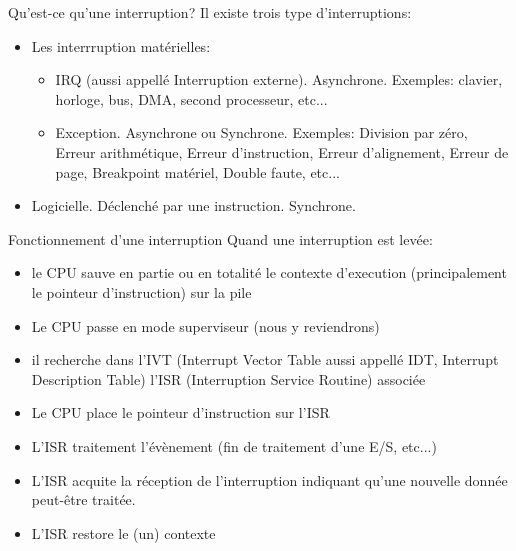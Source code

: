 \begin{frame}{Qu'est-ce qu'une interruption?}
  Il existe trois type d'interruptions:
  \begin{itemize} 
  \item Les interrruption matérielles:
    \begin{itemize} 
    \item IRQ (aussi appellé Interruption externe). Asynchrone. Exemples: clavier, horloge, bus, DMA, second processeur, etc...
    \item Exception.  Asynchrone ou Synchrone.  Exemples: Division par
      zéro,   Erreur   arithmétique,   Erreur  d'instruction,   Erreur
      d'alignement, Erreur de page, Breakpoint matériel, Double faute,
      etc...
    \end{itemize} 
  \item Logicielle. Déclenché par une instruction. Synchrone.
  \end{itemize}
\end{frame} 

\begin{frame}{Fonctionnement d'une interruption}
  Quand une  interruption est levée:
  \begin{itemize} 
  \item le CPU sauve en  partie ou en totalité le contexte d'execution
    (principalement le pointeur d'instruction) sur la pile
  \item Le CPU passe en mode superviseur (nous y reviendrons)
  \item il recherche dans  l'IVT (Interrupt Vector Table aussi appellé
    IDT,  Interrupt  Description  Table) l'ISR  (Interruption  Service
    Routine) associée
  \item Le CPU place le pointeur d'instruction sur l'ISR
  \item  L'ISR traitement  l'évènement (fin  de traitement  d'une E/S,
    etc...)
  \item L'ISR acquite la  réception de l'interruption indiquant qu'une
    nouvelle  donnée peut-être  traitée.
  \item L'ISR restore le (un) contexte
  \end{itemize}
\end{frame}

